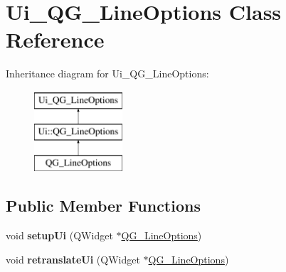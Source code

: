 \hypertarget{classUi__QG__LineOptions}{\section{Ui\-\_\-\-Q\-G\-\_\-\-Line\-Options Class Reference}
\label{classUi__QG__LineOptions}
}
Inheritance diagram for Ui\-\_\-\-Q\-G\-\_\-\-Line\-Options\-:\begin{figure}[H]
\begin{center}
\leavevmode
\includegraphics[height=3.000000cm]{classUi__QG__LineOptions}
\end{center}
\end{figure}
\subsection*{Public Member Functions}
\begin{DoxyCompactItemize}
\item 
\hypertarget{classUi__QG__LineOptions_a97c161246b31a8cd86c292973f670e15}{void {\bfseries setup\-Ui} (Q\-Widget $\ast$\hyperlink{classQG__LineOptions}{Q\-G\-\_\-\-Line\-Options})}\label{classUi__QG__LineOptions_a97c161246b31a8cd86c292973f670e15}

\item 
\hypertarget{classUi__QG__LineOptions_abb746dfccce7869acefd82a839eee804}{void {\bfseries retranslate\-Ui} (Q\-Widget $\ast$\hyperlink{classQG__LineOptions}{Q\-G\-\_\-\-Line\-Options})}\label{classUi__QG__LineOptions_abb746dfccce7869acefd82a839eee804}

\end{DoxyCompactItemize}
